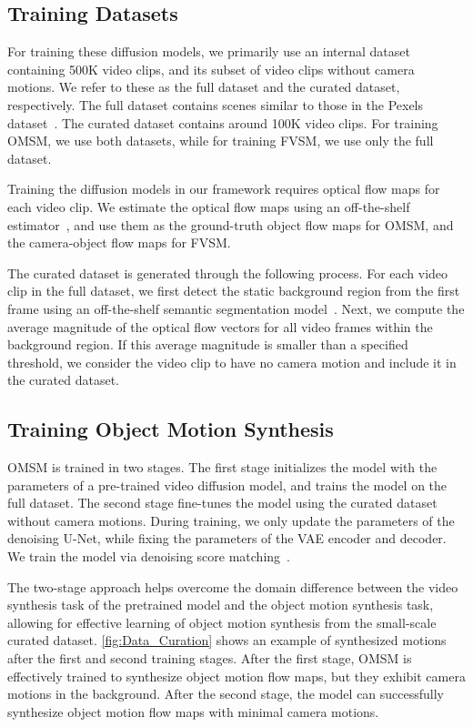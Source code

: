 \subsection{Training Datasets}
For training these diffusion models, we primarily use an internal dataset containing 500K video clips, and its subset of video clips without camera motions. We refer to these as the full dataset and the curated dataset, respectively. The full dataset contains scenes similar to those in the Pexels dataset~\cite{pexels_dataset}.
The curated dataset contains around 100K video clips.
For training OMSM, we use both datasets, while for training FVSM, we use only the full dataset.

Training the diffusion models in our framework requires optical flow maps for each video clip.
We estimate the optical flow maps using an off-the-shelf estimator~\cite{teed2020raft}, and use them as the ground-truth object flow maps for OMSM, and the camera-object flow maps for FVSM. 


The curated dataset is generated through the following process. For each video clip in the full dataset, we first detect the static background region from the first frame using an off-the-shelf semantic segmentation model~\cite{ravi2024sam}. Next, we compute the average magnitude of the optical flow vectors for all video frames within the background region. If this average magnitude is smaller than a specified threshold, we consider the video clip to have no camera motion and include it in the curated dataset.


\subsection{Training Object Motion Synthesis}
\label{sec:Training_MSM}
OMSM is trained in two stages.
The first stage initializes the model with the parameters of a pre-trained video diffusion model, and trains the model on the full dataset.
The second stage fine-tunes the model using the curated dataset without camera motions.
During training, we only update the parameters of the denoising U-Net, while fixing the parameters of the VAE encoder and decoder.
We train the model via denoising score matching~\cite{karras2022elucidating}.

The two-stage approach helps overcome the domain difference between the video synthesis task of the pretrained model and the object motion synthesis task, allowing for effective learning of object motion synthesis from the small-scale curated dataset.
\cref{fig:Data_Curation} shows an example of synthesized motions after the first and second training stages.
After the first stage, OMSM is effectively trained to synthesize object motion flow maps, but they exhibit camera motions in the background.
After the second stage, the model can successfully synthesize object motion flow maps with minimal camera motions.


